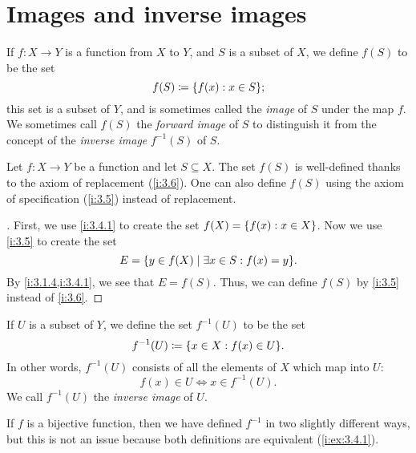\section{Images and inverse images}\label{i:sec:3.4}

\begin{defn}\label{i:3.4.1}
  If \(f : X \to Y\) is a function from \(X\) to \(Y\), and \(S\) is a subset of \(X\), we define \(f(S)\) to be the set
  \[
    f(S) \coloneqq \set{f(x) : x \in S};
  \]
  this set is a subset of \(Y\), and is sometimes called the \emph{image} of \(S\) under the map \(f\).
  We sometimes call \(f(S)\) the \emph{forward image} of \(S\) to distinguish it from the concept of the \emph{inverse image} \(f^{-1}(S)\) of \(S\).
\end{defn}

\begin{ac}\label{i:ac:3.4.1}
  Let \(f : X \to Y\) be a function and let \(S \subseteq X\).
  The set \(f(S)\) is well-defined thanks to the axiom of replacement (\cref{i:3.6}).
  One can also define \(f(S)\) using the axiom of specification (\cref{i:3.5}) instead of replacement.
\end{ac}

\begin{proof}[]
  First, we use \cref{i:3.4.1} to create the set \(f(X) = \left\lbrace f(x) : x \in X\right\rbrace\).
  Now we use \cref{i:3.5} to create the set
  \[
    E = \set{y \in f(X) \mid \exists x \in S : f(x) = y}.
  \]
  By \cref{i:3.1.4,i:3.4.1}, we see that \(E = f(S)\).
  Thus, we can define \(f(S)\) by \cref{i:3.5} instead of \cref{i:3.6}.
\end{proof}

\setcounter{thm}{3}
\begin{defn}\label{i:3.4.4}
  If \(U\) is a subset of \(Y\), we define the set \(f^{-1}(U)\) to be the set
  \[
    f^{-1}(U) \coloneqq \set{x \in X : f(x) \in U}.
  \]
  In other words, \(f^{-1}(U)\) consists of all the elements of \(X\) which map into \(U\):
  \[
    f(x) \in U \iff x \in f^{-1}(U).
  \]
  We call \(f^{-1}(U)\) the \emph{inverse image} of \(U\).
\end{defn}

\setcounter{thm}{6}
\begin{rmk}\label{i:3.4.6}
  If \(f\) is a bijective function, then we have defined \(f^{-1}\) in two slightly different ways, but this is not an issue because both definitions are equivalent (\cref{i:ex:3.4.1}).
\end{rmk}

